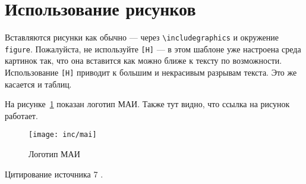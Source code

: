 \section{Использование рисунков}

Вставляются рисунки как обычно --- через 
\texttt{\textbackslash includegraphics} и окружение 
\texttt{figure}. 
Пожалуйста, не используйте \texttt{[H]} --- 
в этом шаблоне уже настроена среда картинок так, 
что она вставится как можно ближе к тексту по возможности. 
Использование \texttt{[H]} приводит к большим и некрасивым 
разрывам текста. Это же касается и таблиц.

На рисунке~\ref{fig:fig01} показан логотип МАИ. 
Также тут видно, что ссылка на рисунок работает.
\begin{figure}
  \texttt{[image: inc/mai]}
  \caption{Логотип МАИ}
  \label{fig:fig01}
\end{figure}


\lipsum[3]

Цитирование источника 7 \cite{Wikipedia7}.
